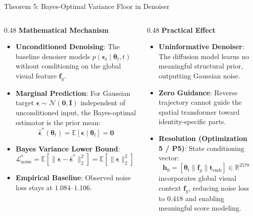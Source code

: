 \documentclass[aspectratio=169,xcolor=dvipsnames]{beamer}
\begin{document}
\begin{frame}{Theorem 5: Bayes-Optimal Variance Floor in Denoiser}
\footnotesize
\begin{columns}[t,onlytextwidth]
\begin{column}{0.48\textwidth}
    \textbf{Mathematical Mechanism}
    \begin{itemize}
        \setlength{\itemsep}{0.25em}
        \item \textbf{Unconditioned Denoising}: The baseline denoiser models $p(\boldsymbol{\epsilon}_t \mid \boldsymbol{\theta}_t, t)$ without conditioning on the global visual feature $\mathbf{f}_g$.
        \item \textbf{Marginal Prediction}: For Gaussian target $\boldsymbol{\epsilon} \sim \mathcal{N}(\mathbf{0}, \mathbf{I})$ independent of unconditioned input, the Bayes-optimal estimator is the prior mean:
        $$\hat{\boldsymbol{\epsilon}}^*(\boldsymbol{\theta}_t) = \mathbb{E}[\boldsymbol{\epsilon} \mid \boldsymbol{\theta}_t] = \mathbf{0}$$
        \item \textbf{Bayes Variance Lower Bound}:
        $$\mathcal{L}_{\text{noise}}^* = \mathbb{E}\left[\|\boldsymbol{\epsilon} - \hat{\boldsymbol{\epsilon}}^*\|_2^2\right] = \mathbb{E}\left[\|\boldsymbol{\epsilon}\|_2^2\right] = 1.000$$
        \item \textbf{Empirical Baseline}: Observed noise loss stays at $1.084$--$1.106$.
    \end{itemize}
\end{column}
\begin{column}{0.48\textwidth}
    \textbf{Practical Effect}
    \begin{itemize}
        \setlength{\itemsep}{0.25em}
        \item \textbf{Uninformative Denoiser}: The diffusion model learns no meaningful structural prior, outputting Gaussian noise.
        \item \textbf{Zero Guidance}: Reverse trajectory cannot guide the spatial transformer toward identity-specific parts.
        \item \textbf{Resolution (Optimization 5 / P5)}: State conditioning vector:
        $$\mathbf{h}_0 = [\boldsymbol{\theta}_t \parallel \mathbf{f}_g \parallel \mathbf{t}_{\text{emb}}] \in \mathbb{R}^{2578}$$
        incorporates global visual context $\mathbf{f}_g$, reducing noise loss to $0.418$ and enabling meaningful score modeling.
    \end{itemize}
\end{column}
\end{columns}
\end{frame}
\end{document}
